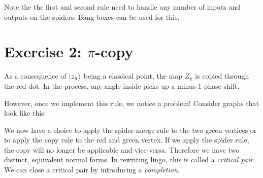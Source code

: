 \documentclass{article}
\begin{document}
Note the the first and second rule need to handle any number of inputs and outputs on the spiders. Bang-boxes can be used for this.

\medskip
{}
\medskip

\section*{Exercise 2: $\pi$-copy}

As a consequence of $\left| z_\pi \right\rangle$ being a classical point, the map $Z_\pi$ is copied through the red dot. In the process, any angle inside picks up a minus-1 phase shift.


\medskip
{}
\medskip

However, once we implement this rule, we notice a problem! Consider graphs that look like this:


We now have a choice to apply the spider-merge rule to the two green vertices or to apply the copy rule to the red and green vertex. If we apply the spider rule, the copy will no longer be applicable and vice-versa. Therefore we have two distinct, equivalent normal forms. In rewriting lingo, this is called a \textit{critical pair}. We can close a critical pair by introducing a \textit{completion}.


\medskip
{}
\medskip
\end{document}
